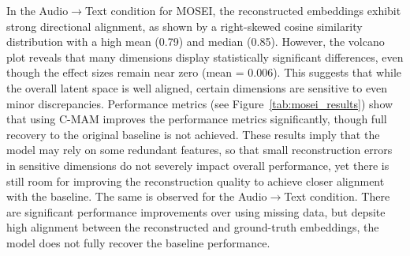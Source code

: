 \begin{table}[hbt!]
    \centering
    \caption{Analysis of how varying the cosine loss term influences model performance metrics and embedding reconstruction in the MM-IMDb multimodal dataset.}
    \label{tab:mmimdb_sub_ablation}
\end{table}


In the Audio$\rightarrow$Text condition for MOSEI, the reconstructed embeddings exhibit strong directional alignment, as shown by a right-skewed cosine similarity distribution with a high mean (0.79) and median (0.85). However, the volcano plot reveals that many dimensions display statistically significant differences, even though the effect sizes remain near zero (mean = 0.006). This suggests that while the overall latent space is well aligned, certain dimensions are sensitive to even minor discrepancies. Performance metrics (see Figure~\ref{tab:mosei_results}) show that using C-MAM improves the performance metrics significantly, though full recovery to the original baseline is not achieved. These results imply that the model may rely on some redundant features, so that small reconstruction errors in sensitive dimensions do not severely impact overall performance, yet there is still room for improving the reconstruction quality to achieve closer alignment with the baseline. The same is observed for the Audio$\rightarrow$Text condition. There are significant performance improvements over using missing data, but depsite high alignment between the reconstructed and ground-truth embeddings, the model does not fully recover the baseline performance.

